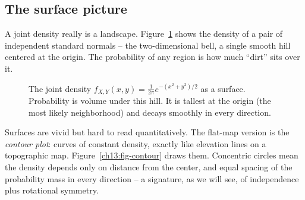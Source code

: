 \subsection{The surface picture}

A joint density really is a landscape. Figure~\ref{ch13:fig-surface} shows the
density of a pair of independent standard normals -- the two-dimensional bell, a
single smooth hill centered at the origin. The probability of any region is how
much ``dirt'' sits over it.

\begin{figure}[H]
\centering
{}
\caption{The joint density $f_{X,Y}(x,y)=\frac{1}{2\pi}e^{-(x^2+y^2)/2}$ as a
surface. Probability is volume under this hill. It is tallest at the origin
(the most likely neighborhood) and decays smoothly in every direction.}
\label{ch13:fig-surface}
\end{figure}

Surfaces are vivid but hard to read quantitatively. The flat-map version is the
\emph{contour plot}: curves of constant density, exactly like elevation lines on
a topographic map. Figure~\ref{ch13:fig-contour} draws them. Concentric circles
mean the density depends only on distance from the center, and equal spacing of
the probability mass in every direction -- a signature, as we will see, of
independence plus rotational symmetry.

